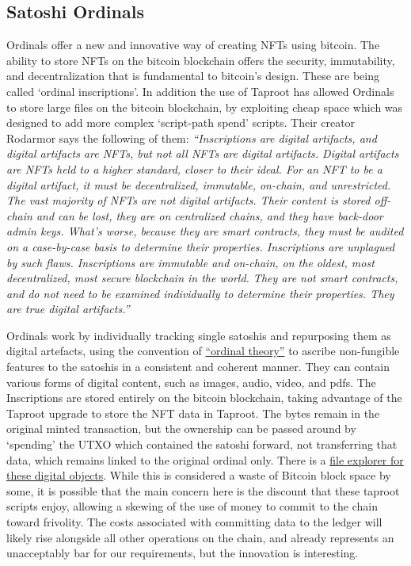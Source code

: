\subsection{Satoshi Ordinals}
Ordinals offer a new and innovative way of creating NFTs using bitcoin. The ability to store NFTs on the bitcoin blockchain offers the security, immutability, and decentralization that is fundamental to bitcoin's design. These are being called `ordinal inscriptions'. In addition the use of Taproot has allowed Ordinals to store large files on the bitcoin blockchain, by exploiting cheap space which was designed to add more complex `script-path spend' scripts. Their creator Rodarmor says the following of them: \textit{``Inscriptions are digital artifacts, and digital artifacts are NFTs, but not all NFTs are digital artifacts. Digital artifacts are NFTs held to a higher standard, closer to their ideal. For an NFT to be a digital artifact, it must be decentralized, immutable, on-chain, and unrestricted. The vast majority of NFTs are not digital artifacts. Their content is stored off-chain and can be lost, they are on centralized chains, and they have back-door admin keys. What's worse, because they are smart contracts, they must be audited on a case-by-case basis to determine their properties. Inscriptions are unplagued by such flaws. Inscriptions are immutable and on-chain, on the oldest, most decentralized, most secure blockchain in the world. They are not smart contracts, and do not need to be examined individually to determine their properties. They are true digital artifacts.''}\par
Ordinals work by individually tracking single satoshis and repurposing them as digital artefacts, using the convention of \href{https://docs.ordinals.com/overview.html}{``ordinal theory''} to ascribe non-fungible features to the satoshis in a consistent and coherent manner. They can contain various forms of digital content, such as images, audio, video, and pdfs. The Inscriptions are stored entirely on the bitcoin blockchain, taking advantage of the Taproot upgrade to store the NFT data in Taproot. The bytes remain in the original minted transaction, but the ownership can be passed around by `spending' the UTXO which contained the  satoshi forward, not transferring that data, which remains linked to the original ordinal only. There is a \href{https://ordinals.com/}{file explorer for these digital objects}. While this is considered a waste of Bitcoin block space by some, it is possible that the main concern here is the discount that these taproot scripts enjoy, allowing a skewing of the use of money to commit to the chain toward frivolity. The costs associated with committing data to the ledger will likely rise alongside all other operations on the chain, and already represents an unacceptably bar for our requirements, but the innovation is interesting.\par
